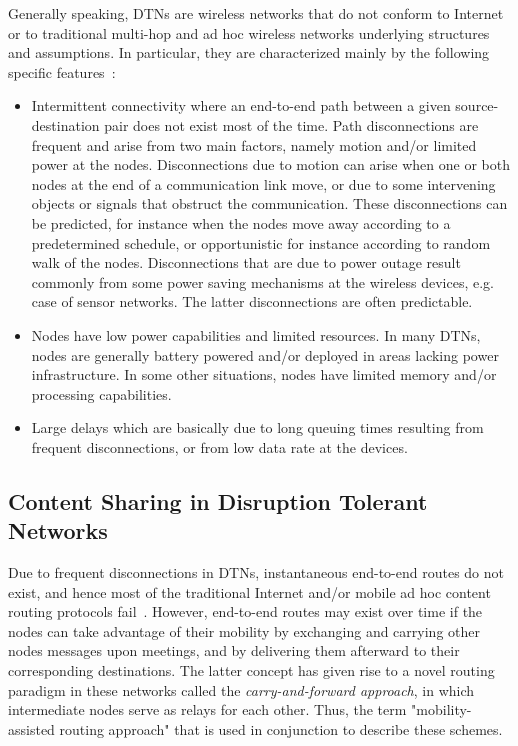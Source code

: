 Generally speaking, DTNs are wireless networks that do not conform to Internet or to traditional multi-hop and ad hoc wireless networks underlying structures and assumptions.
In particular, they are characterized mainly by the following specific features~\cite{fall03, DTNTutorial}:

\begin{itemize}
\item{Intermittent connectivity where an end-to-end path between a given source-destination pair does not exist most of the time. Path disconnections are frequent and arise from
two main factors, namely motion and/or limited power at the nodes. Disconnections due to motion can arise when one or both nodes at the end of a communication link move, or due to some intervening objects or signals that obstruct the communication. These disconnections can be predicted, for instance when the nodes move away
according to a predetermined schedule, or opportunistic for instance according to random walk of the nodes. Disconnections that are due to power outage result
commonly from some power saving mechanisms at the wireless devices, e.g. case of sensor networks. The latter disconnections are often predictable.}
\item{Nodes have low power capabilities and limited resources. In many DTNs, nodes are generally battery powered and/or deployed in areas lacking power infrastructure. In
some other situations, nodes have limited memory and/or processing capabilities.}
\item{Large delays which are basically due to long queuing times resulting from frequent disconnections, or from low data rate at the devices.}
\end{itemize}

\subsection{Content Sharing in Disruption Tolerant Networks}

Due to frequent disconnections in DTNs, instantaneous end-to-end routes do not exist, and hence most of the traditional Internet and/or mobile ad hoc content routing protocols fail~\cite{Fall:DTNrouting}. However, end-to-end routes may exist over time if the nodes can take advantage of their mobility by exchanging and carrying other nodes messages upon meetings, and by delivering them afterward to their corresponding destinations. The latter concept has given rise to a novel routing paradigm in these networks called the \emph{carry-and-forward approach}, in which intermediate nodes serve as relays for each other. Thus, the term "mobility-assisted routing approach" that is used in conjunction to describe these schemes.

